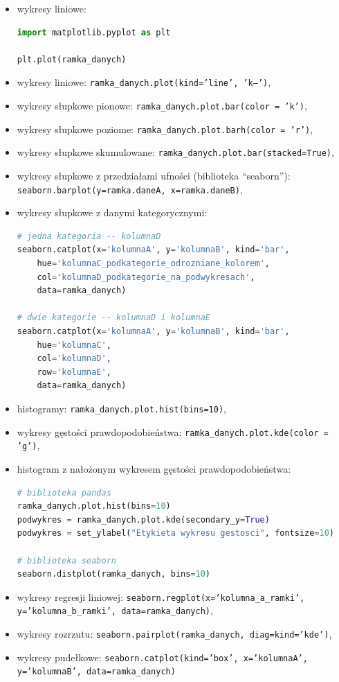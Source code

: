 \documentclass[11pt]{report}
\begin{document}
\begin{itemize}
    \item wykresy liniowe:

          \begin{lstlisting}[language=Python]
import matplotlib.pyplot as plt

plt.plot(ramka_danych)
\end{lstlisting}

    \item wykresy liniowe: \texttt{ramka\_danych.plot(kind='line', 'k--')},
    \item wykresy słupkowe pionowe: \texttt{ramka\_danych.plot.bar(color = 'k')},
    \item wykresy słupkowe poziome: \texttt{ramka\_danych.plot.barh(color = 'r')},
    \item wykresy słupkowe skumulowane: \texttt{ramka\_danych.plot.bar(stacked=True)},
    \item wykresy słupkowe z przedziałami ufności (biblioteka \enquote{seaborn}): \\ \texttt{seaborn.barplot(y=ramka.daneA, x=ramka.daneB)},
    \item wykresy słupkowe z danymi kategorycznymi:

          \begin{lstlisting}[language=Python]
# jedna kategoria -- kolumnaD
seaborn.catplot(x='kolumnaA', y='kolumnaB', kind='bar',
    hue='kolumnaC_podkategorie_odrozniane_kolorem', 
    col='kolumnaD_podkategorie_na_podwykresach', 
    data=ramka_danych)

# dwie kategorie -- kolumnaD i kolumnaE
seaborn.catplot(x='kolumnaA', y='kolumnaB', kind='bar',
    hue='kolumnaC',
    col='kolumnaD',
    row='kolumnaE',
    data=ramka_danych)
\end{lstlisting}

    \item histogramy: \texttt{ramka\_danych.plot.hist(bins=10)},
    \item wykresy gęstości prawdopodobieństwa: \texttt{ramka\_danych.plot.kde(color = 'g')},
    \item histogram z nałożonym wykresem gęstości prawdopodobieństwa:

          \begin{lstlisting}[language=Python]
# biblioteka pandas
ramka_danych.plot.hist(bins=10)
podwykres = ramka_danych.plot.kde(secondary_y=True)
podwykres = set_ylabel("Etykieta wykresu gestosci", fontsize=10)

# biblioteka seaborn
seaborn.distplot(ramka_danych, bins=10)
\end{lstlisting}

    \item wykresy regresji liniowej: \texttt{seaborn.regplot(x='kolumna\_a\_ramki', y='kolumna\_b\_ramki', data=ramka\_danych)},
    \item wykresy rozrzutu: \texttt{seaborn.pairplot(ramka\_danych, diag=kind='kde')},

    \item wykresy pudełkowe: \texttt{seaborn.catplot(kind='box', x='kolumnaA', y='kolumnaB', data=ramka\_danych)}

\end{itemize}
\end{document}
